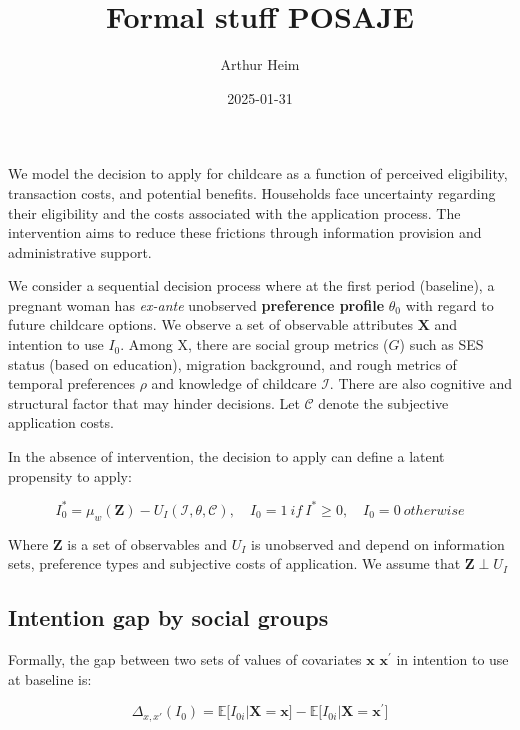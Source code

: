 \documentclass[
]{article}
\title{Formal stuff POSAJE}
\author{Arthur Heim}
\date{2025-01-31}
\newcommand{\espb}[1]{\mathds{E}\Big[ #1 \Big]}
\begin{document}
\maketitle

We model the decision to apply for childcare as a function of perceived eligibility, transaction costs, and potential benefits. Households face uncertainty regarding their eligibility and the costs associated with the application process. The intervention aims to reduce these frictions through information provision and administrative support.

We consider a sequential decision process where at the first period (baseline),
a pregnant woman has \emph{ex-ante} unobserved \textbf{preference profile} \(\theta_0\) with regard to future childcare options. We observe a set of observable attributes \(\mathbf{X}\) and intention to use \(I_0\). Among X, there are social group metrics (\(G\)) such as SES status (based on education), migration background, and rough metrics of temporal preferences \(\rho\) and knowledge of childcare \(\mathcal{I}\). There are also cognitive and structural factor that may hinder decisions. Let \(\mathcal{C}\) denote the subjective application costs.

In the absence of intervention, the decision to apply can define a latent propensity to apply:

\begin{equation}
I_0^*=\mu_w(\mathbf{Z})-U_I(\mathcal{I},\theta,\mathcal{C}),\quad I_0=1 ~ if ~I^*\geq 0,\quad I_0=0~otherwise
\end{equation}

Where \(\mathbf{Z}\) is a set of observables and \(U_I\) is unobserved and depend on information sets, preference types and subjective costs of application. We assume that \(\mathbf{Z}\perp U_I\)

\subsection{Intention gap by social groups}\label{intention-gap-by-social-groups}

Formally, the gap between two sets of values of covariates \(\mathbf{x}\) \(\mathbf{x^\prime}\) in intention to use at baseline is:

\begin{equation}
\Delta_{x,x'}(I_{0}) = \espb{I_{0i}|\mathbf{X}=\mathbf{x}}-\espb{I_{0i}|\mathbf{X}=\mathbf{x^\prime}}
\end{equation}
\end{document}
